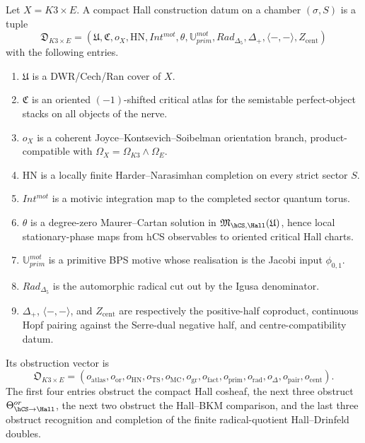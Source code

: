 \begin{definition}
\label{gluing:def:compact-k3e-hall-construction-datum}
Let \(X=K3\times E\). A compact Hall construction datum on a chamber
\((\sigma,S)\) is a tuple
\[
 \mathfrak D_{K3\times E}
 =
 (\mathfrak U,\mathfrak C,o_X,\mathrm{HN},Int^{mot},
 \theta,\mathbb U^{mot}_{prim},Rad_{\Delta_5},
 \Delta_+,\langle-,-\rangle,Z_{\mathrm{cent}})
\]
with the following entries.
\begin{enumerate}
\item \(\mathfrak U\) is a DWR/Cech/Ran cover of \(X\).
\item \(\mathfrak C\) is an oriented \((-1)\)-shifted critical atlas
for the semistable perfect-object stacks on all objects of the nerve.
\item \(o_X\) is a coherent Joyce--Kontsevich--Soibelman orientation
branch, product-compatible with
\(\Omega_X=\Omega_{K3}\wedge\Omega_E\).
\item \(\mathrm{HN}\) is a locally finite Harder--Narasimhan completion
on every strict sector \(S\).
\item \(Int^{mot}\) is a motivic integration map to the completed
sector quantum torus.
\item \(\theta\) is a degree-zero Maurer--Cartan solution in
\(\mathfrak M_{\hCS,\Hall}(\mathfrak U)\), hence local stationary-phase
maps from hCS observables to oriented critical Hall charts.
\item \(\mathbb U^{mot}_{prim}\) is a primitive BPS motive whose
realisation is the Jacobi input \(\phi_{0,1}\).
\item \(Rad_{\Delta_5}\) is the automorphic radical cut out by the
Igusa denominator.
\item \(\Delta_+\), \(\langle-,-\rangle\), and \(Z_{\mathrm{cent}}\)
are respectively the positive-half coproduct, continuous Hopf pairing
against the Serre-dual negative half, and centre-compatibility datum.
\end{enumerate}
Its obstruction vector is
\[
 \mathfrak O_{K3\times E}
 =
 (o_{\mathrm{atlas}},o_{\mathrm{or}},o_{\mathrm{HN}},o_{\mathrm{TS}},
 o_{\mathrm{MC}},o_{\mathrm{gr}},o_{\mathrm{fact}},
 o_{\mathrm{prim}},o_{\mathrm{rad}},o_{\Delta},o_{\mathrm{pair}},
 o_{\mathrm{cent}}).
\]
The first four entries obstruct the compact Hall cosheaf, the next
three obstruct \(\Theta_{\hCS\to\Hall}^{or}\), the next two obstruct the
Hall--BKM comparison, and the last three obstruct recognition and
completion of the finite radical-quotient Hall--Drinfeld doubles.
\end{definition}

